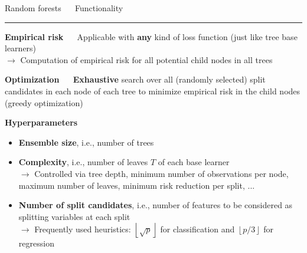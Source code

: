 \documentclass[11pt,compress,t,notes=noshow, xcolor=table]{beamer}
\begin{document}

\LARGE
\begin{frame}{\textcolor{gray!80}{Random forests} ~~ Functionality}
\normalsize
\vspace{-0.5cm}
\noindent \textcolor{gray!80}{\rule{\textwidth}{1pt}}

\vspace{0.3cm}

\footnotesize

\textbf{\textcolor{gray!80}{Empirical risk}} ~~
Applicable with \textbf{any} kind of loss function (just like tree base learners) 
\\
$\rightarrow$ Computation of empirical risk for all potential child nodes in all 
trees

\medskip

\textbf{\textcolor{gray!80}{Optimization}} ~~ \textbf{Exhaustive} search over
all (randomly selected) split candidates in each node of each tree to minimize
empirical risk in the child nodes (greedy optimization) \\

\medskip

\textbf{\textcolor{gray!80}{Hyperparameters}}

\begin{itemize}
  \item \textbf{Ensemble size}, i.e., number of trees
  \item \textbf{Complexity}, i.e., number of leaves $T$ of each base learner \\
  $\rightarrow$ Controlled via tree depth, minimum number of observations per 
  node, maximum number of leaves, minimum risk reduction per split, ...
  \item \textbf{Number of split candidates}, i.e., number of features to be
  considered as splitting variables at each split \\
  $\rightarrow$ Frequently used heuristics: 
  $\left \lfloor{\sqrt{p}}\right \rfloor$ for classification and
  $\left \lfloor{p/3}\right \rfloor$ for regression
\end{itemize}
  
\end{frame}


\end{document}
